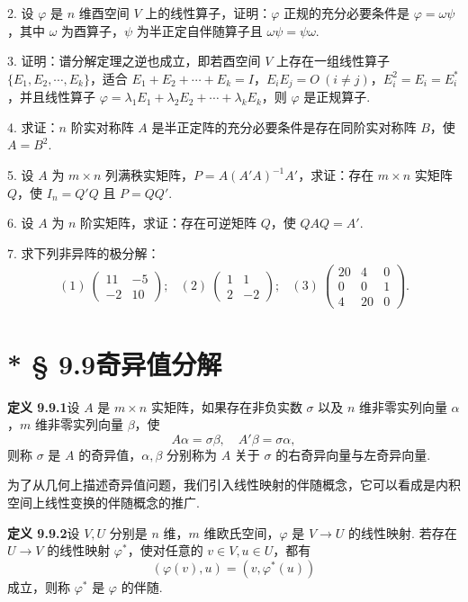 \documentclass[UTF8,12pt,a4paper,fontset=fandol]{ctexart}
\begin{document}
2. 设 $\varphi$ 是 $n$ 维酉空间 $V$ 上的线性算子，证明：$\varphi$ 正规的充分必要条件是 $\varphi=\omega\psi$，其中 $\omega$ 为酉算子，$\psi$ 为半正定自伴随算子且 $\omega\psi=\psi\omega$.

3. 证明：谱分解定理之逆也成立，即若酉空间 $V$ 上存在一组线性算子 $\{E_1,E_2,\cdots,E_k\}$，适合 $E_1+E_2+\cdots+E_k=I$，$E_iE_j=O\ (i\ne j)$，$E_i^2=E_i=E_i^*$，并且线性算子 $\varphi=\lambda_1E_1+\lambda_2E_2+\cdots+\lambda_kE_k$，则 $\varphi$ 是正规算子.

4. 求证：$n$ 阶实对称阵 $A$ 是半正定阵的充分必要条件是存在同阶实对称阵 $B$，使 $A=B^2$.

5. 设 $A$ 为 $m\times n$ 列满秩实矩阵，$P=A(A'A)^{-1}A'$，求证：存在 $m\times n$ 实矩阵 $Q$，使 $I_n=Q'Q$ 且 $P=QQ'$.

6. 设 $A$ 为 $n$ 阶实矩阵，求证：存在可逆矩阵 $Q$，使 $QAQ=A'$.

7. 求下列非异阵的极分解：
\[
\begin{array}{lll}
(1)\ \left(\begin{array}{rr}11 & -5\\ -2 & 10\end{array}\right);
&
(2)\ \left(\begin{array}{rr}1 & 1\\ 2 & -2\end{array}\right);
&
(3)\ \left(\begin{array}{rrr}20 & 4 & 0\\ 0 & 0 & 1\\ 4 & 20 & 0\end{array}\right).
\end{array}
\]

\section*{* § 9.9\quad 奇异值分解}

\noindent\textbf{定义 9.9.1}\quad 设 $A$ 是 $m\times n$ 实矩阵，如果存在非负实数 $\sigma$ 以及 $n$ 维非零实列向量 $\alpha$，$m$ 维非零实列向量 $\beta$，使
\[
  A\alpha=\sigma\beta,\quad A'\beta=\sigma\alpha,
\]
则称 $\sigma$ 是 $A$ 的奇异值，$\alpha,\beta$ 分别称为 $A$ 关于 $\sigma$ 的右奇异向量与左奇异向量.

为了从几何上描述奇异值问题，我们引入线性映射的伴随概念，它可以看成是内积空间上线性变换的伴随概念的推广.

\noindent\textbf{定义 9.9.2}\quad 设 $V,U$ 分别是 $n$ 维，$m$ 维欧氏空间，$\varphi$ 是 $V\to U$ 的线性映射. 若存在 $U\to V$ 的线性映射 $\varphi^*$，使对任意的 $v\in V,u\in U$，都有
\[
  (\varphi(v),u)=(v,\varphi^*(u))
\]
成立，则称 $\varphi^*$ 是 $\varphi$ 的伴随.
\end{document}

